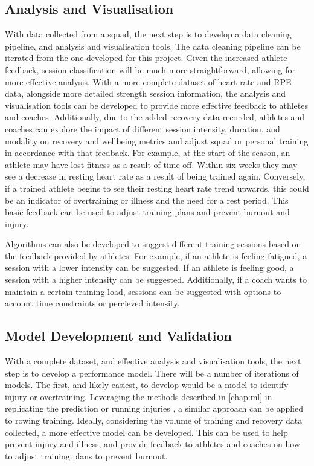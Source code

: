 \subsection{Analysis and Visualisation}
With data collected from a squad, the next step is to develop a data cleaning pipeline, and analysis and visualisation tools. The data cleaning pipeline can be iterated from the one developed for this project. Given the increased athlete feedback, session classification will be much more straightforward, allowing for more effective analysis. With a more complete dataset of heart rate and RPE data, alongside more detailed strength session information, the analysis and visualisation tools can be developed to provide more effective feedback to athletes and coaches. Additionally, due to the added recovery data recorded, athletes and coaches can explore the impact of different session intensity, duration, and modality on recovery and wellbeing metrics and adjust squad or personal training in accordance with that feedback. For example, at the start of the season, an athlete may have lost fitness as a result of time off. Within six weeks they may see a decrease in resting heart rate as a result of being trained again. Conversely, if a trained athlete begins to see their resting heart rate trend upwards, this could be an indicator of overtraining or illness and the need for a rest period. This basic feedback can be used to adjust training plans and prevent burnout and injury.

Algorithms can also be developed to suggest different training sessions based on the feedback provided by athletes. For example, if an athlete is feeling fatigued, a session with a lower intensity can be suggested. If an athlete is feeling good, a session with a higher intensity can be suggested. Additionally, if a coach wants to maintain a certain training load, sessions can be suggested with options to account time constraints or percieved intensity.

\subsection{Model Development and Validation}
With a complete dataset, and effective analysis and visualisation tools, the next step is to develop a performance model. There will be a number of iterations of models. The first, and likely easiest, to develop would be a model to identify injury or overtraining. Leveraging the methods described in \autoref{chap:ml} in replicating the prediction or running injuries \cite{Lovdal2021}, a similar approach can be applied to rowing training. Ideally, considering the volume of training and recovery data collected, a more effective model can be developed. This can be used to help prevent injury and illness, and provide feedback to athletes and coaches on how to adjust training plans to prevent burnout.

